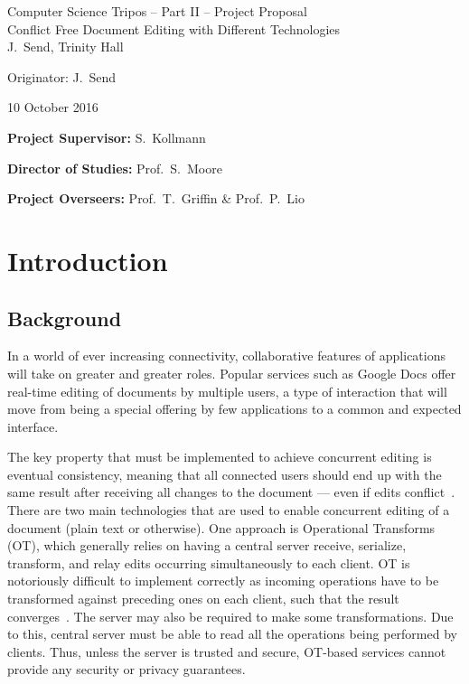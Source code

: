 \documentclass[12pt,a4paper,twoside]{article}
\begin{document}
\begin{center}
\Large
Computer Science Tripos -- Part II -- Project Proposal\\[4mm]
\LARGE
Conflict Free Document Editing with Different Technologies\\[4mm]

\large
J.~Send, Trinity Hall

Originator: J.~Send

10 October 2016
\end{center}

\vspace{5mm}

\textbf{Project Supervisor:} S.~Kollmann

\textbf{Director of Studies:} Prof.~S.~Moore

\textbf{Project Overseers:} Prof.~T.~Griffin \& Prof.~P.~Lio


\section*{Introduction}

\subsection*{Background}

In a world of ever increasing connectivity, collaborative features of applications
will take on greater and greater roles. Popular services such as Google Docs offer real-time
editing of documents by multiple users, a type of interaction that will move from being
a special offering by few applications to a common and expected interface.

The key property that must be implemented to achieve concurrent editing is eventual consistency,
meaning that all connected users should end up with the same result after receiving all changes to the document 
--- even if edits conflict~\cite{Technion}. There are two main technologies that are used to enable concurrent editing of a document (plain text or otherwise). One approach is Operational Transforms (OT), 
which generally relies  on having a central server receive, serialize, transform, and 
relay edits occurring simultaneously to each client. OT is notoriously difficult to implement 
correctly as incoming operations have to be transformed against preceding ones on each client, 
such that the result converges~\cite{sun1998operational}. The server may also be required to make some transformations. 
Due to this, central server must be able to read all the operations being performed by clients.
Thus, unless the server is trusted and secure, OT-based services cannot provide any security or privacy guarantees. 
\end{document}
